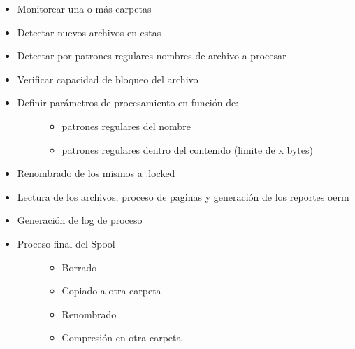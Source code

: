 \documentclass[a4paper,12pt,spanish]{sphinxmanual}
\begin{document}
\begin{itemize}
\item {} 
Monitorear una o más carpetas

\item {} 
Detectar nuevos archivos en estas

\item {} 
Detectar por patrones regulares nombres de archivo a procesar

\item {} 
Verificar capacidad de bloqueo del archivo

\item {} \begin{description}
\item[{Definir parámetros de procesamiento en función de:}] \leavevmode\begin{itemize}
\item {} 
patrones regulares del nombre

\item {} 
patrones regulares dentro del contenido (limite de x bytes)

\end{itemize}

\end{description}

\item {} 
Renombrado de los mismos a .locked

\item {} 
Lectura de los archivos, proceso de paginas y generación de los reportes oerm

\item {} 
Generación de log de proceso

\item {} \begin{description}
\item[{Proceso final del Spool}] \leavevmode\begin{itemize}
\item {} 
Borrado

\item {} 
Copiado a otra carpeta

\item {} 
Renombrado

\item {} 
Compresión en otra carpeta

\end{itemize}

\end{description}

\end{itemize}
\end{document}
